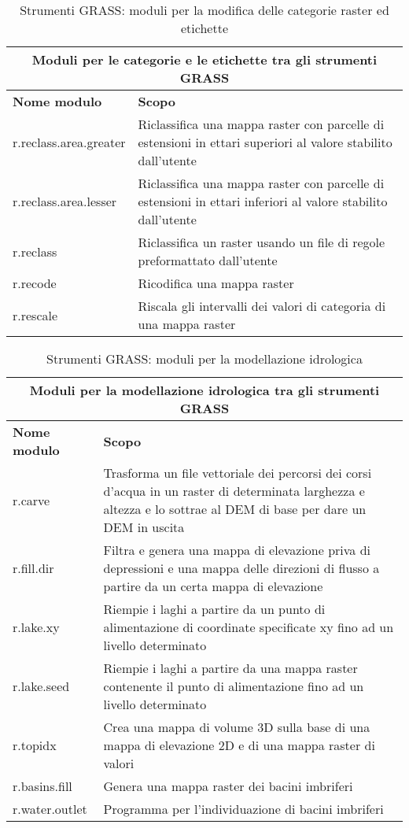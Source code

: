 \begin{table}[ht]
\centering
\caption{Strumenti GRASS: moduli per la modifica delle categorie raster ed etichette}\medskip
 \begin{tabular}{|p{4cm}|p{12cm}|}
  \hline \multicolumn{2}{|c|}{\textbf{Moduli per le categorie e le etichette tra gli strumenti GRASS}} \\
  \hline \textbf{Nome modulo} & \textbf{Scopo} \\
  \hline r.reclass.area.greater & Riclassifica una mappa raster con parcelle di estensioni in ettari superiori al valore stabilito dall'utente \\
  \hline r.reclass.area.lesser &  Riclassifica una mappa raster con parcelle di estensioni in ettari inferiori al valore stabilito dall'utente \\
  \hline r.reclass & Riclassifica un raster usando un file di regole preformattato dall'utente \\
  \hline r.recode & Ricodifica una mappa raster \\
  \hline r.rescale & Riscala gli intervalli dei valori di categoria di una mappa raster \\
\hline
\end{tabular}
\end{table}

\begin{table}[ht]
\centering
\caption{Strumenti GRASS: moduli per la modellazione idrologica}\medskip
 \begin{tabular}{|p{4cm}|p{12cm}|}
  \hline \multicolumn{2}{|c|}{\textbf{Moduli per la modellazione idrologica tra gli strumenti GRASS}} \\
  \hline \textbf{Nome modulo} & \textbf{Scopo} \\
  \hline r.carve & Trasforma un file vettoriale dei percorsi dei corsi d'acqua in un raster di determinata larghezza e altezza e lo sottrae al DEM di base per dare un DEM in uscita \\
  \hline r.fill.dir & Filtra e genera una mappa di elevazione priva di depressioni e una mappa delle direzioni di flusso a partire da un certa mappa di elevazione \\
  \hline r.lake.xy & Riempie i laghi a partire da un punto di alimentazione di coordinate specificate xy fino ad un livello determinato \\
  \hline r.lake.seed & Riempie i laghi a partire da una mappa raster contenente il punto di alimentazione fino ad un livello determinato \\
  \hline r.topidx & Crea una mappa di volume 3D sulla base di una mappa di elevazione 2D e di una mappa raster di valori \\
  \hline r.basins.fill & Genera una mappa raster dei bacini imbriferi \\
  \hline r.water.outlet & Programma per l'individuazione di bacini imbriferi \\
\hline
\end{tabular}
\end{table}

